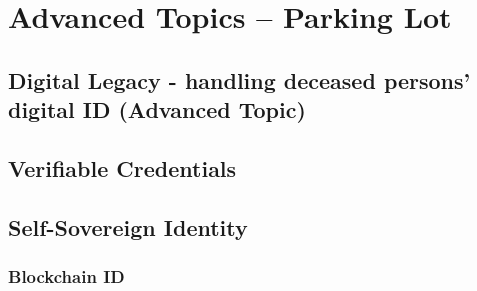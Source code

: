 \hypertarget{advanced-topics-parking-lot}{%
\chapter{Advanced Topics -- Parking
Lot}\label{advanced-topics-parking-lot}}

\hypertarget{digital-legacy---handling-deceased-persons-digital-id-advanced-topic}{%
\section{Digital Legacy - handling deceased persons' digital ID
(Advanced
Topic)}\label{digital-legacy---handling-deceased-persons-digital-id-advanced-topic}}

\hypertarget{verifiable-credentials}{%
\section{Verifiable Credentials}\label{verifiable-credentials}}

\hypertarget{self-sovereign-identity}{%
\section{Self-Sovereign Identity}\label{self-sovereign-identity}}

\hypertarget{blockchain-id}{%
\subsection{Blockchain ID}\label{blockchain-id}}
